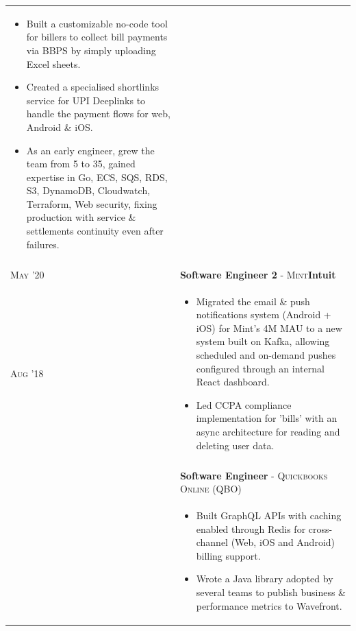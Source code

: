 \documentclass[a4paper,10pt]{extarticle} %
\begin{document}
\begin{tabularx}{\linewidth}{l | X}
\begin{itemize}[leftmargin=*, nosep, before=\vspace{-1.0\baselineskip}, after=\vspace{-1.0\baselineskip}]
  \item Built a customizable no-code tool for billers to collect bill payments via BBPS by simply uploading Excel sheets.
  \item Created a specialised shortlinks service for UPI Deeplinks to handle the payment flows for web, Android \& iOS.
  \item As an early engineer, grew the team from 5 to 35, gained expertise in Go, ECS, SQS, RDS, S3, DynamoDB, Cloudwatch, Terraform, Web security, fixing production with service \& settlements continuity even after failures.
\end{itemize}\\
\multicolumn{2}{c}{} \\

\textsc{May '20} & \textbf{Software Engineer 2} \textsc{- Mint}\hfill\raisebox{-.1\height}{ \hspace{0.3em}}\textbf{Intuit}\\
\textsc{Aug '18} & \begin{itemize}[leftmargin=*, nosep, before=\vspace{-1.0\baselineskip}, after=\vspace{-1.6\baselineskip}]
  \item Migrated the email \& push notifications system (Android + iOS) for Mint's 4M MAU to a new system built on Kafka, allowing scheduled and on-demand pushes configured through an internal React dashboard.
  \item Led CCPA compliance implementation for 'bills' with an async architecture for reading and deleting user data.
\end{itemize}\\\\
& \textbf{Software Engineer} \textsc{- Quickbooks Online (QBO)}\\
& \begin{itemize}[leftmargin=*, nosep, before=\vspace{-1.0\baselineskip}, after=\vspace{-1.6\baselineskip}]
  \item Built GraphQL APIs with caching enabled through Redis for cross-channel (Web, iOS and Android) billing support.
  \item Wrote a Java library adopted by several teams to publish business \& performance metrics to Wavefront.

\end{itemize}
\end{tabularx}
\end{document}
